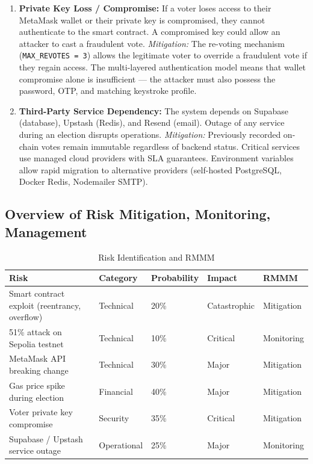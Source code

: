 \documentclass[oneside,a4paper,12pt]{book}
\begin{document}
\begin{enumerate}[leftmargin=1.5cm]
    \item \textbf{Private Key Loss / Compromise:} If a voter loses access to their MetaMask wallet or their private key is compromised, they cannot authenticate to the smart contract. A compromised key could allow an attacker to cast a fraudulent vote. \textit{Mitigation:} The re-voting mechanism (\texttt{MAX\_REVOTES = 3}) allows the legitimate voter to override a fraudulent vote if they regain access. The multi-layered authentication model means that wallet compromise alone is insufficient --- the attacker must also possess the password, OTP, and matching keystroke profile.

    \item \textbf{Third-Party Service Dependency:} The system depends on Supabase (database), Upstash (Redis), and Resend (email). Outage of any service during an election disrupts operations. \textit{Mitigation:} Previously recorded on-chain votes remain immutable regardless of backend status. Critical services use managed cloud providers with SLA guarantees. Environment variables allow rapid migration to alternative providers (self-hosted PostgreSQL, Docker Redis, Nodemailer SMTP).
\end{enumerate}

\subsection{Overview of Risk Mitigation, Monitoring, Management}

\begin{table}[htbp]
\centering
\renewcommand{\arraystretch}{1.3}
\small
\begin{tabularx}{\textwidth}{|X|p{2cm}|p{2cm}|p{2cm}|p{2.5cm}|}
\hline
\textbf{Risk} & \textbf{Category} & \textbf{Probability} & \textbf{Impact} & \textbf{RMMM} \\
\hline
Smart contract exploit (reentrancy, overflow) & Technical & 20\% & Catastrophic & Mitigation \\
\hline
51\% attack on Sepolia testnet & Technical & 10\% & Critical & Monitoring \\
\hline
MetaMask API breaking change & Technical & 30\% & Major & Mitigation \\
\hline
Gas price spike during election & Financial & 40\% & Major & Mitigation \\
\hline
Voter private key compromise & Security & 35\% & Critical & Mitigation \\
\hline
Supabase / Upstash service outage & Operational & 25\% & Major & Monitoring \\
\hline
\end{tabularx}
\caption{Risk Identification and RMMM}
\label{tab:risk}
\end{table}
\end{document}
